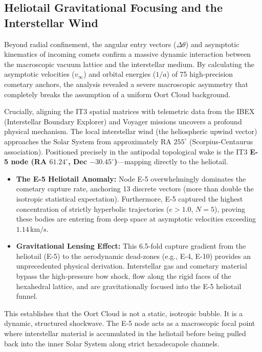 \documentclass[11pt,a4paper]{article}
\theoremstyle{remark}
\begin{document}
\subsection{Heliotail Gravitational Focusing and the Interstellar Wind}

Beyond radial confinement, the angular entry vectors ($\Delta\theta$) and asymptotic kinematics of incoming comets confirm a massive dynamic interaction between the macroscopic vacuum lattice and the interstellar medium. By calculating the asymptotic velocities ($v_\infty$) and orbital energies ($1/a$) of 75 high-precision cometary anchors, the analysis revealed a severe macroscopic asymmetry that completely breaks the assumption of a uniform Oort Cloud background.

Crucially, aligning the IT3 spatial matrices with telemetric data from the IBEX (Interstellar Boundary Explorer) and Voyager missions uncovers a profound physical mechanism. The local interstellar wind (the heliospheric upwind vector) approaches the Solar System from approximately RA $255^\circ$ (Scorpius-Centaurus association). Positioned precisely in the antipodal topological wake is the IT3 \textbf{E-5 node (RA $61.24^\circ$, Dec $-30.45^\circ$)}---mapping directly to the heliotail.

\begin{itemize}[leftmargin=2em]
    \item \textbf{The E-5 Heliotail Anomaly:} Node E-5 overwhelmingly dominates the cometary capture rate, anchoring 13 discrete vectors (more than double the isotropic statistical expectation). Furthermore, E-5 captured the highest concentration of strictly hyperbolic trajectories ($e > 1.0$, $N=5$), proving these bodies are entering from deep space at asymptotic velocities exceeding $1.14\,\mathrm{km/s}$.
    \item \textbf{Gravitational Lensing Effect:} This 6.5-fold capture gradient from the heliotail (E-5) to the aerodynamic dead-zones (e.g., E-4, E-10) provides an unprecedented physical derivation. Interstellar gas and cometary material bypass the high-pressure bow shock, flow along the rigid faces of the hexahedral lattice, and are gravitationally focused into the E-5 heliotail funnel.
\end{itemize}

This establishes that the Oort Cloud is not a static, isotropic bubble. It is a dynamic, structured shockwave. The E-5 node acts as a macroscopic focal point where interstellar material is accumulated in the heliotail before being pulled back into the inner Solar System along strict hexadecapole channels.
\end{document}
